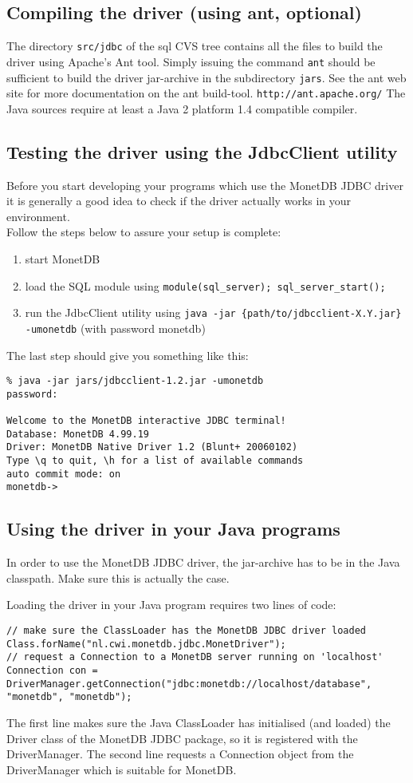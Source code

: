 \documentclass{article}
\begin{document}
\subsection{Compiling the driver (using ant, optional)}
The directory \texttt{src/jdbc} of the sql CVS tree contains all the
files to build the driver using Apache's Ant tool.  Simply issuing the
command \texttt{ant} should be sufficient to build the driver
jar-archive in the subdirectory \texttt{jars}. See the ant web site for
more documentation on the ant build-tool.
\texttt{http://ant.apache.org/}  The Java sources require at least a
Java 2 platform 1.4 compatible compiler.

\subsection{Testing the driver using the JdbcClient utility}
Before you start developing your programs which use the MonetDB JDBC
driver it is generally a good idea to check if the driver actually works
in your environment.\\
Follow the steps below to assure your setup is complete:
\begin{enumerate}
\item start MonetDB
\item load the SQL module using \texttt{module(sql\_server);
sql\_server\_start();}
\item run the JdbcClient utility using \texttt{java -jar
\{path/to/jdbcclient-X.Y.jar\} -umonetdb} (with
 password monetdb)
\end{enumerate}
The last step should give you something like this:
\begin{verbatim}
% java -jar jars/jdbcclient-1.2.jar -umonetdb
password:

Welcome to the MonetDB interactive JDBC terminal!
Database: MonetDB 4.99.19
Driver: MonetDB Native Driver 1.2 (Blunt+ 20060102)
Type \q to quit, \h for a list of available commands
auto commit mode: on
monetdb-> 
\end{verbatim}

\subsection{Using the driver in your Java programs}
In order to use the MonetDB JDBC driver, the jar-archive has to be in
the Java classpath.  Make sure this is actually the case.

Loading the driver in your Java program requires two lines of code:
\begin{verbatim}
// make sure the ClassLoader has the MonetDB JDBC driver loaded
Class.forName("nl.cwi.monetdb.jdbc.MonetDriver");
// request a Connection to a MonetDB server running on 'localhost'
Connection con = DriverManager.getConnection("jdbc:monetdb://localhost/database", "monetdb", "monetdb");
\end{verbatim}
The first line makes sure the Java ClassLoader has initialised (and
loaded) the Driver class of the MonetDB JDBC package, so it is
registered with the DriverManager.  The second line requests a Connection
object from the DriverManager which is suitable for MonetDB.
\end{document}

